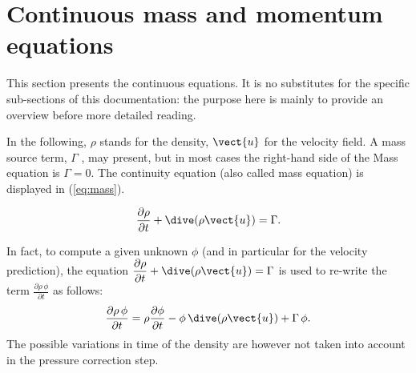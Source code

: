 
%
%
%
%


\section{Continuous mass and momentum equations}

This section presents the continuous equations. It is no substitutes for the
specific sub-sections of this documentation: the purpose here is mainly to
provide an overview before more detailed reading.

In the following, $\rho $ stands for the density, $\vect{u}$ for the
velocity field. A mass source term, $\Gamma $ , may present, but in most
cases the right-hand side of the Mass equation is $\Gamma =0$. 
The continuity equation (also called mass equation) is displayed in (\ref{eq:mass}).

\begin{equation}\label{eq:mass}
\dfrac{\partial \rho}{\partial t} + \dive(\rho \vect{u})=\Gamma.
\end{equation}

In fact, to compute a given unknown $\phi$ (and in particular for the
velocity prediction),
 the equation 
$\displaystyle \frac{\partial \rho}{\partial t} + \dive(\rho \vect{u}) = \Gamma$ 
is used to re-write the term 
$\displaystyle \frac{\partial \rho\,\phi}{\partial t}$ as follows:
\begin{equation*}
\dfrac{\partial \rho\,\phi}{\partial t} = \rho \dfrac{\partial  \phi}{\partial t} - \phi\,\dive(\rho \vect{u})
+ \Gamma\,\phi.
\end{equation*}
The possible variations in time of the density are however
not taken into account in the pressure correction step.

